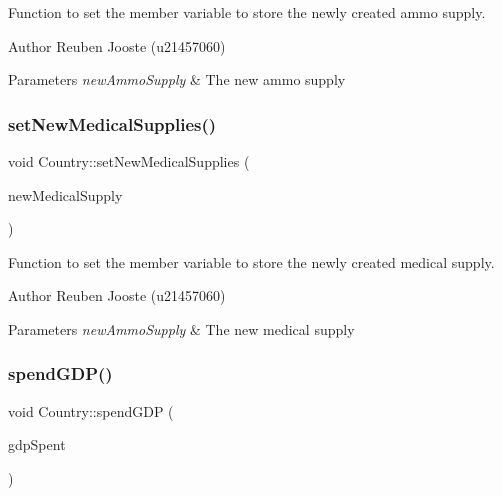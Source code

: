Function to set the member variable to store the newly created ammo supply. 

\begin{DoxyAuthor}{Author}
Reuben Jooste (u21457060) 
\end{DoxyAuthor}

\begin{DoxyParams}{Parameters}
{\em new\+Ammo\+Supply} & The new ammo supply \\
\hline
\end{DoxyParams}
\mbox{\label{class_country_a0db028ef78f6b28b925e504e8f017266}} 
\subsubsection{\texorpdfstring{setNewMedicalSupplies()}{setNewMedicalSupplies()}}
{\footnotesize\ttfamily void Country\+::set\+New\+Medical\+Supplies (\begin{DoxyParamCaption}\item[{\mbox{\hyperlink{class_medical_supply}{Medical\+Supply}} $\ast$}]{new\+Medical\+Supply }\end{DoxyParamCaption})}



Function to set the member variable to store the newly created medical supply. 

\begin{DoxyAuthor}{Author}
Reuben Jooste (u21457060) 
\end{DoxyAuthor}

\begin{DoxyParams}{Parameters}
{\em new\+Ammo\+Supply} & The new medical supply \\
\hline
\end{DoxyParams}
\mbox{\label{class_country_ad39ce8ab2c88a4ff7e09d3fcab56f558}} 
\subsubsection{\texorpdfstring{spendGDP()}{spendGDP()}}
{\footnotesize\ttfamily void Country\+::spend\+G\+DP (\begin{DoxyParamCaption}\item[{double}]{gdp\+Spent }\end{DoxyParamCaption})}



